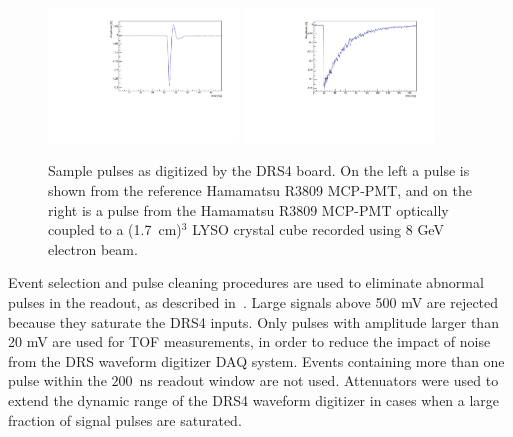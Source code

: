 \begin{figure}[h] \centering
\includegraphics[width=0.45\textwidth]{figs/RefPulse} 
\includegraphics[width=0.45\textwidth]{figs/run064_event506} 
\caption{\small Sample pulses as digitized by the DRS4 board. 
On the left a pulse is shown from the reference Hamamatsu R3809 MCP-PMT, 
and on the right is a pulse from the Hamamatsu R3809 MCP-PMT
optically coupled to a (1.7~cm)$^{3}$ LYSO crystal cube
recorded using  8 GeV electron beam.} 
\label{fig:PulseShapes}
\end{figure}

Event selection and pulse cleaning procedures are used to eliminate abnormal
pulses in the readout, as described in~\cite{MCPFastCaloNIMA}. Large signals
above 500 mV are rejected because they saturate the DRS4 inputs. Only pulses
with amplitude larger than 20 mV are used for TOF measurements, in
order to reduce the impact of noise from the DRS waveform digitizer DAQ system.
Events containing more than one pulse within the $200$~ns readout window are not
used. Attenuators were used to extend the dynamic range of the DRS4
waveform digitizer in cases when a large fraction of signal pulses are saturated.

